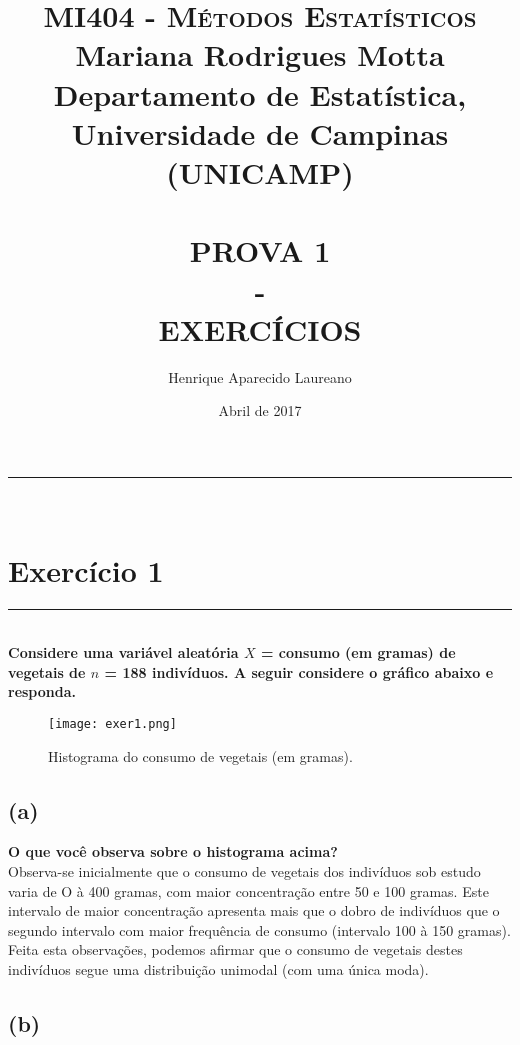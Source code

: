 \documentclass[12pt, oldfontcommands]{article}\usepackage[]{graphicx}\usepackage[]{color}
\title{  
 \normalfont \normalsize 
 \textsc{MI404 - Métodos Estatísticos} \\
 Mariana Rodrigues Motta \\
 Departamento de Estatística, Universidade de Campinas (UNICAMP) \\ [25pt]
 \horrule{.5pt} \\ [.4cm]
 \LARGE PROVA 1 \\
  - \\
  EXERCÍCIOS
 \horrule{2pt} \\[ .5cm]}
\author{Henrique Aparecido Laureano}
\date{\normalsize Abril de 2017}
\newcommand{\horrule}[1]{\rule{\linewidth}{#1}}
\begin{document}
\maketitle

\vspace{\fill}

\tableofcontents

\horrule{1pt} \\

\newpage



\section*{Exercício 1} 

\horrule{1pt} \\

\textbf{Considere uma variável aleatória \(X\) = consumo (em gramas) de
        vegetais de \(n\) = 188 indivíduos. A seguir considere o gráfico
        abaixo e responda.}

\vspace{\fill}
\begin{figure}[H]
 \centering
  \texttt{[image: exer1.png]}
 \caption{Histograma do consumo de vegetais (em gramas).}
 \label{fig:exer1}
\end{figure}

\subsection*{(a)} 

\textbf{O que você observa sobre o histograma acima?} \\

\quad
Observa-se inicialmente que o consumo de vegetais dos indivíduos sob
estudo varia de O à 400 gramas, com maior concentração entre 50 e 100
gramas. Este intervalo de maior concentração apresenta mais que o dobro de
indivíduos que o segundo intervalo com maior frequência de consumo
(intervalo 100 à 150 gramas). Feita esta observações, podemos afirmar que
o consumo de vegetais destes indivíduos segue uma distribuição unimodal
(com uma única moda).
     
\subsection*{(b)} 
\end{document}
